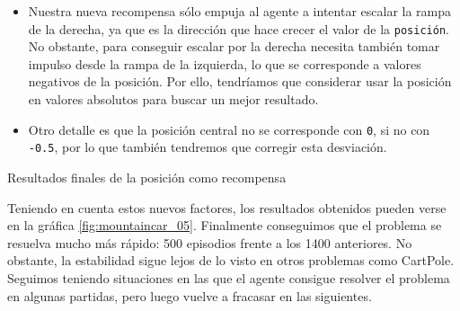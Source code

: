 \begin{itemize}
    \item Nuestra nueva recompensa sólo empuja al agente a intentar escalar la rampa de la derecha, ya que es la dirección que hace crecer el valor de la \texttt{posición}. No obstante, para conseguir escalar por la derecha necesita también tomar impulso desde la rampa de la izquierda, lo que se corresponde a valores negativos de la posición. Por ello, tendríamos que considerar usar la posición en valores absolutos para buscar un mejor resultado.
    \item Otro detalle es que la posición central no se corresponde con \texttt{0}, si no con \texttt{-0.5}, por lo que también tendremos que corregir esta desviación.
\end{itemize}

%
       {Resultados finales de la posición como recompensa}

Teniendo en cuenta estos nuevos factores, los resultados obtenidos pueden verse en la gráfica \ref{fig:mountaincar_05}. Finalmente conseguimos que el problema se resuelva mucho más rápido: 500 episodios frente a los 1400 anteriores. No obstante, la estabilidad sigue lejos de lo visto en otros problemas como CartPole. Seguimos teniendo situaciones en las que el agente consigue resolver el problema en algunas partidas, pero luego vuelve a fracasar en las siguientes.


